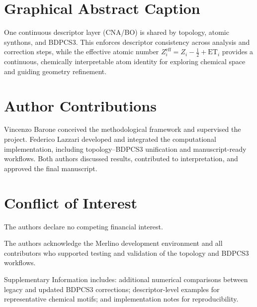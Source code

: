 \documentclass[journal=jctcce,manuscript=article]{achemso}
\begin{document}
\section*{Graphical Abstract Caption}
One continuous descriptor layer (CNA/BO) is shared by topology, atomic synthons, and BDPCS3. This enforces descriptor consistency across analysis and correction steps, while the effective atomic number $Z_i^{\mathrm{eff}}=Z_i-\frac{1}{2}+\mathrm{ET}_i$ provides a continuous, chemically interpretable atom identity for exploring chemical space and guiding geometry refinement.

\section*{Author Contributions}
Vincenzo Barone conceived the methodological framework and supervised the project.
Federico Lazzari developed and integrated the computational implementation, including topology--BDPCS3 unification and manuscript-ready workflows.
Both authors discussed results, contributed to interpretation, and approved the final manuscript.

\section*{Conflict of Interest}
The authors declare no competing financial interest.

\begin{acknowledgement}
The authors acknowledge the Merlino development environment and all contributors who supported testing and validation of the topology and BDPCS3 workflows.
\end{acknowledgement}

\begin{suppinfo}
Supplementary Information includes: additional numerical comparisons between legacy and updated BDPCS3 corrections; descriptor-level examples for representative chemical motifs; and implementation notes for reproducibility.
\end{suppinfo}

\begin{tocentry}
\centering
{}
\end{tocentry}
\end{document}

